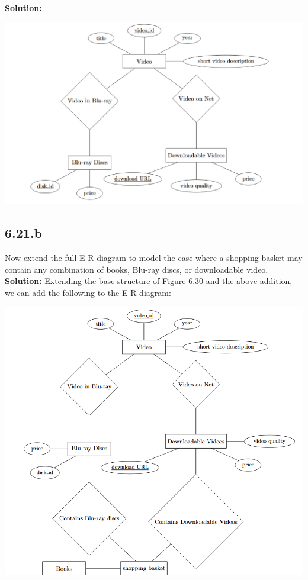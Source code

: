 \documentclass[12pt,a4paper]{article}
\begin{document}
\textbf{Solution:}

\begin{center}
\includegraphics[width=1\textwidth]{6.21.png}
\end{center}

\subsection*{6.21.b}Now extend the full E-R diagram to model the case where a shopping basket may contain any combination of books, Blu-ray discs, or downloadable video.\\

\textbf{Solution:} Extending the base structure of Figure 6.30 and the above addition, we can add the following to the E-R diagram:

\begin{center}
\includegraphics[width=1\textwidth]{6.21.b.png}
\end{center}
\newpage
\end{document}
